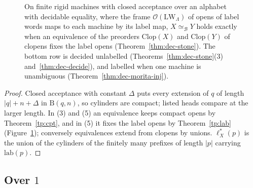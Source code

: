 \documentclass{lmcs}
\theoremstyle{definition}
\theoremstyle{remark}
\newcommand{\Op}{\mathcal{O}}
\newcommand{\dimn}[1]{\lvert #1\rvert}
\newcommand{\BB}{\mathrm{B}}
\newcommand{\lab}{\mathrm{lab}}
\newcommand{\LW}{\mathrm{LW}}
\providecommand{\lab}{\mathrm{lab}}
\providecommand{\eqB}{\simeq_{\mathcal{B}}}
\providecommand{\lst}[1]{\ell^{*}_{#1}}
\begin{document}
\begin{figure}[htb]
\centering
{}
\caption{On finite rigid machines with closed acceptance over an alphabet with decidable equality, where the frame $\Op(\LW_\Lambda)$ of opens of label words maps to each machine by its label map, $X\eqB Y$ holds exactly when an equivalence of the preorders
$\mathrm{Clop}(X)$ and $\mathrm{Clop}(Y)$ of clopens fixes the label opens (Theorem~\ref{thm:dec-stone}). The bottom row is decided unlabelled (Theorems~\ref{thm:dec-stone}(3) and~\ref{thm:dec-decide}), and labelled when one machine is unambiguous (Theorem~\ref{thm:dec-morita-inj}).}
\label{fig:stone}
\end{figure}

\begin{proof}
Closed acceptance with constant $\Delta$ puts every extension of $q$ of length $\dimn{q}+n+\Delta$ in $\BB(q,n)$, so cylinders
are compact; listed heads compare at the larger
length. In (3) and (5) an equivalence keeps compact opens by Theorem~\ref{tp:cpt}, and in (5)
it fixes the label opens by Theorem~\ref{tp:lab} (Figure~\ref{fig:stone}); conversely
equivalences extend from clopens by unions. $\lst{X}(p)$ is the union of the
cylinders of the finitely many prefixes of length $\dimn{p}$ carrying
$\lab(p)$.
\end{proof}

\subsection{Over $1$}\label{ssec:decide-total}
\end{document}
